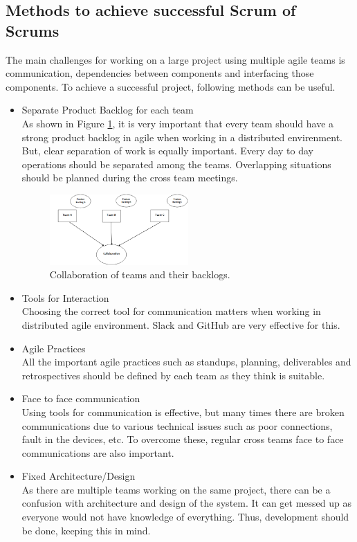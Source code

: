 \documentclass[sigconf]{acmart}
\begin{document}
\subsection{Methods to achieve successful Scrum of Scrums}
The main challenges for working on a large project using multiple agile teams is communication, dependencies between components and interfacing those components. To achieve a successful project, following methods can be useful. 
\begin{itemize}
\item Separate Product Backlog for each team
\\As shown in Figure \ref{fig:PBCollab}, it is very important that every team should have a strong product backlog in agile when working in a distributed envirenment. But, clear separation of work is equally important. Every day to day operations should be separated among the teams. Overlapping situations should be planned during the cross team meetings.
\begin{figure}[H]
  \includegraphics[width=0.5\textwidth]{PBCollab}
  \caption{Collaboration of teams and their backlogs.}
  \label{fig:PBCollab}
\end{figure}

\item Tools for Interaction
\\Choosing the correct tool for communication matters when working in distributed agile environment. Slack and GitHub are very effective for this.

\item Agile Practices
\\All the important agile practices such as standups, planning, deliverables and retrospectives should be defined by each team as they think is suitable.

\item Face to face communication 
\\Using tools for communication is effective, but many times there are broken communications due to various technical issues such as poor connections, fault in the devices, etc. To overcome these, regular cross teams face to face communications are also important.

\item Fixed Architecture/Design
\\As there are multiple teams working on the same project, there can be a confusion with architecture and design of the system. It can get messed up as everyone would not have knowledge of everything. Thus, development should be done, keeping this in mind.
\end{itemize}
\end{document}

